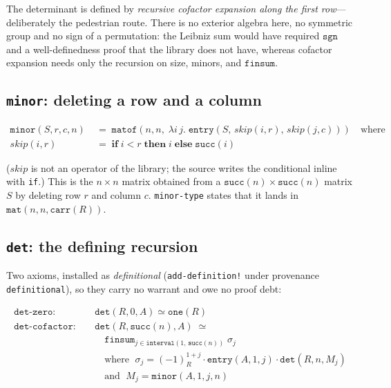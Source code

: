 The determinant is defined by \emph{recursive cofactor expansion along
the first row}---deliberately the pedestrian route.  There is no
exterior algebra here, no symmetric group and no sign of a permutation:
the Leibniz sum would have required $\mathtt{sgn}$ and a well-definedness
proof that the library does not have, whereas cofactor expansion needs
only the recursion on size, minors, and $\mathtt{finsum}$.

\subsection{\texttt{minor}: deleting a row and a column}

\begin{align*}
  \mathtt{minor}(S, r, c, n) &\;=\;
  \mathtt{matof}(n, n,\; \lambda i\, j.\;
    \mathtt{entry}(S,\, \mathit{skip}(i,r),\, \mathit{skip}(j,c)))
  \quad\text{where}\\
  \mathit{skip}(i, r) &\;=\;
    \mathbf{if}\; i < r \;\mathbf{then}\; i \;\mathbf{else}\; \mathtt{succ}(i)
\end{align*}

\noindent
($\mathit{skip}$ is not an operator of the library; the source writes the
conditional inline with \texttt{if}.)  This is
the $n \times n$ matrix obtained from a
$\mathtt{succ}(n) \times \mathtt{succ}(n)$ matrix $S$ by deleting row $r$
and column $c$.  \texttt{minor-type} states that it lands in
$\mathtt{mat}(n, n, \mathtt{carr}(R))$.

\subsection{\texttt{det}: the defining recursion}

Two axioms, installed as \emph{definitional}
(\texttt{add-definition!} under provenance \texttt{definitional}),
so they carry no warrant and owe no proof debt:

\begin{align*}
\mathtt{det\text{-}zero}: &\quad \mathtt{det}(R, 0, A) \simeq \mathtt{one}(R) \\
\mathtt{det\text{-}cofactor}: &\quad
  \mathtt{det}(R, \mathtt{succ}(n), A) \;\simeq\; {} \\
 &\qquad \textstyle\mathtt{finsum}_{j \in \mathtt{interval}(1,\,\mathtt{succ}(n))}\;
   \sigma_j \\
 &\qquad\text{where }\;
   \sigma_j = (-1)^{1+j}_{R} \cdot \mathtt{entry}(A, 1, j) \cdot
   \mathtt{det}(R, n, M_j) \\
 &\qquad\text{and }\; M_j = \mathtt{minor}(A, 1, j, n)
\end{align*}

